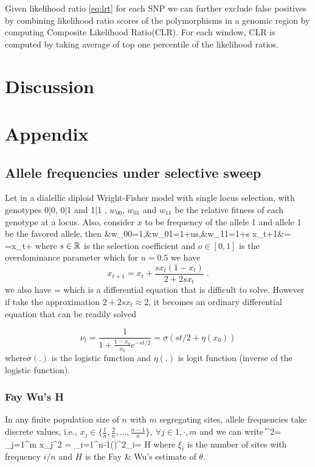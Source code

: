 \documentclass[11pt]{article}
\begin{document}
Given likelihood ratio \eqref{eq:lrt} for each SNP we can further exclude false 
positives by combining likelihood ratio scores of the polymorphisms in a 
genomic region by computing Composite 
Likelihood 
Ratio(CLR)\cite{nielsen2005genomic,williamson2007localizing,vitti2013detecting}.
For each window, CLR is computed by taking average of top one percentile of the 
likelihood ratios.

\section{Discussion}


\section{Appendix}
\subsection{Allele frequencies under selective sweep} \label{app:af}
Let in a dialellic diploid Wright-Fisher model with single locus selection, 
with genotypes 0|0, 0|1 and 1|1 , $w_{00}$, $w_{01}$ and  $w_{11}$ be the 
relative fitness of each genotype at a locus. Also, consider $x$ to be 
frequency of the allele 1 and allele 1 be the favored allele, then
\beq
&w_{00}=1,&w_{01}=1+us,&w_{11}=1+s
\eeq
\beq
x_{t+1}&= =x_t+ 
\eeq
where $s\in {\mathbb R}$ is the selection coefficient and $o\in[0,1]$ is the 
overdominance parameter which for $u=0.5$ we have
\begin{equation}
x_{t+1}=x_t+\frac{sx_t(1-x_t)}{2+2sx_t}\;.
\label{eq:transition}
\end{equation}
we also have
\beq
{} = 
\eeq
which is a differential equation that is difficult to solve. However if take 
the approximation $2+2sx_t \approx 2$, it becomes an ordinary differential 
equation that can be readily solved

\begin{equation}
\nu_t =\frac{1}{1+\frac{1-x_0}{x_0}e^{-st/2}} = \sigma(st/2+\eta(x_0)) 
\label{eq:inf-pop}
\end{equation}
where$\sigma(.)$ is the logistic
function and $\eta(.)$ is logit function (inverse of the logistic function). 

\subsubsection{Fay Wu's H}\label{app:h}
\bl
In any finite population size of $n$ with $m$ segregating sites, 
allele frequencies take 
discrete values, i.e.,  $x_j \in 
\{\frac{1}{n},\frac{2}{n},\ldots,\frac{n-1}{n}\}, \ \forall j \in{1,\cdot,m}$ 
and we can write
\beq
\|\bfx\|^2= \sum_{j=1}^{m} x_j^2 = 
\sum_{i=1}^{n-1}\left(\right)^2\xi_i= 
H 
\eeq
where $\xi_i$ is the number of sites with frequency $i/n$ and $H$ is the 
Fay \& Wu's estimate of $\theta$.
\el
\end{document}
